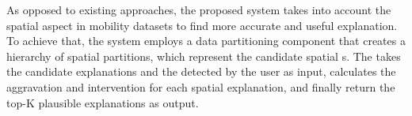 
As opposed to existing approaches, the proposed system takes into account the spatial aspect in mobility datasets to find more accurate and useful explanation.
To achieve that, the system employs a data partitioning component that creates a hierarchy of spatial partitions, which represent the candidate spatial {\explanation}s. %
The {\evaluator} takes the candidate explanations and the {\fact} detected by the user as input, calculates the aggravation and intervention for each spatial explanation, and finally return the top-K plausible explanations as output.








